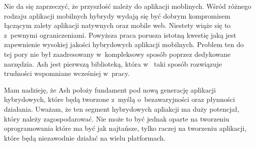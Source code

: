 \documentclass[brudnopis]{xmgr}
\begin{document}
Nie da się zaprzeczyć, że przyszłość należy do aplikacji moblinych. Wśród różnego rodzaju aplikacji mobilnych hybrydy wydają się być dobrym kompromisem łączącym zalety aplikacji natywnych oraz mobile web. Niestety wiąże się to z~pewnymi ograniczeniami. Powyższa praca porusza istotną kwestię jaką jest zapewnienie wysokiej jakości hybrydowych aplikacji mobilnych. Problem ten do tej pory nie był zaadresowany w~kompleksowy sposób poprzez dedykowane narzędzia. Ash jest pierwszą biblioteką, która w~ taki sposób rozwiązuje trudności wspomniane wcześniej w~pracy.

Mam nadzieję, że Ash położy fundament pod nową generację aplikacji hybrydowych, które będą tworzone z~myślą o~bezawaryjności oraz płynności działania. Uważam, że ten segment hybrydowych apliakcji ma duży potencjał, który należy zagospodarować. Nie może to być jednak oparte na tworzeniu oprogramowania które ma być jak najtańsze, tylko raczej na tworzeniu aplikacji, które będą niezawodnie działać na wielu platformach.

\nocite{*}

\appendix






\oswiadczenie
\end{document}
